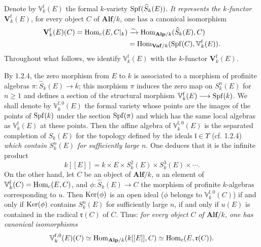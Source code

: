 Denote by $\mathbb V_k^{\mathrm f}(E)$ the formal $k$-variety $\operatorname{Spf}(\widehat S_k(E))$. \emph{It represents the $k$-functor $\mathbf V_k^{\mathrm f}(E)$}, \ie for every object $C$ of $\mathbf{Alf}/k$, one has a canonical isomorphism
\[
\begin{aligned}
\mathbf V_k^{\mathrm f}(E)(C)=\operatorname{Hom}_c(E,C|_k)&\xrightarrow{\sim}\operatorname{Hom}_{\mathbf{Alp}/k}(\widehat S_k(E),C)\\
&=\operatorname{Hom}_{\mathbf{Vaf}/k}(\operatorname{Spf}(C),\mathbb V_k^{\mathrm f}(E)).
\end{aligned}
\]
Throughout what follows, we identify $\mathbb V_k^{\mathrm f}(E)$ with the $k$-functor $\mathbf V_k^{\mathrm f}(E)$.

By 1.2.4, the zero morphism from $E$ to $k$ is associated to a morphism of profinite algebras $\pi:\widehat S_k(E)\to k$; this morphism $\pi$ induces the zero map on $S_k^n(E)$ for $n\geq1$ and defines a section of the structural morphism $\mathbb V_k^{\mathrm f}(E)\longrightarrow\operatorname{Spf}(k)$.
We shall denote by $\mathbb V_k^{\mathrm f,0}(E)$ the formal variety whose points are the images of the points of $\operatorname{Spf}(k)$ under the section $\operatorname{Spf}(\pi)$ and which has the same local algebras as $\mathbb V_k^{\mathrm f}(E)$ at these points.
Then the affine algebra of $\mathbb V_k^{\mathrm f,0}(E)$ is the separated completion of $S_k(E)$ for the topology defined by the ideals $\mathfrak l\in\Upsilon$ (cf. 1.2.4) \emph{which contain $S_k^n(E)$ for sufficiently large $n$}. One deduces that it is the infinite product
\[
k[[E]]=k\times E\times S_k^2(E)\times S_k^3(E)\times\cdots.
\]
On the other hand, let $C$ be an object of $\mathbf{Alf}/k$, $u$ an element of $\mathbb V_k^{\mathrm f}(C)=\operatorname{Hom}_c(E,C)$, and $\phi:\widehat S_k(E)\to C$ the morphism of profinite $k$-algebras corresponding to $u$. Then $\operatorname{Ker}(\phi)$ is an open ideal (\ie $\phi$ belongs to $\mathbb V_k^{\mathrm f,0}(C)$) if and only if $\operatorname{Ker}(\phi)$ contains $S_k^n(E)$ for sufficiently large $n$, \ie if and only if $u(E)$ is contained in the radical $\mathfrak r(C)$ of $C$.
Thus: \emph{for every object $C$ of $\mathbf{Alf}/k$, one has canonical isomorphisms}
\[
\mathbb V_k^{\mathrm f,0}(E)(C)\simeq\operatorname{Hom}_{\mathbf{Alp}/k}(k[[E]],C)\simeq\operatorname{Hom}_c(E,\mathfrak r(C)).
\]

